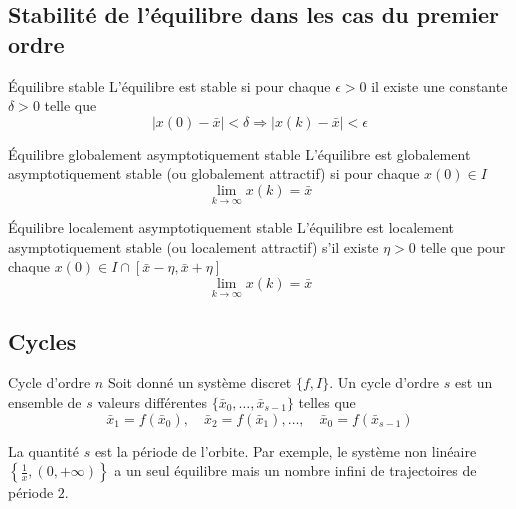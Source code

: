     \subsection{Stabilité de l'équilibre dans les cas du premier ordre}
        \begin{definition}{Équilibre stable}
            L'équilibre est stable si pour chaque $\epsilon > 0$ il existe une constante $\delta > 0$ telle que 
            \begin{equation}
                |x(0) - \bar{x}| < \delta \Rightarrow |x(k) - \bar{x}| < \epsilon
            \end{equation}
        \end{definition}
        \begin{definition}{Équilibre globalement asymptotiquement stable}
            L'équilibre est globalement asymptotiquement stable (ou globalement attractif) si pour chaque $x(0) \in I$
            \begin{equation}
                \lim_{k \to \infty} x(k) = \bar{x}
            \end{equation}
        \end{definition}
        \begin{definition}{Équilibre localement asymptotiquement stable}
            L'équilibre est localement asymptotiquement stable (ou localement attractif) s'il existe $\eta > 0$ telle que pour chaque $x(0) \in I \cap [\bar{x} - \eta, \bar{x} + \eta]$ 
            \begin{equation}
                \lim_{k \to \infty} x(k) = \bar{x}
            \end{equation}
        \end{definition}

        \subsection{Cycles}
            \begin{definition}{Cycle d'ordre $n$}
                Soit donné un système discret $\{f, I\}$. Un cycle d'ordre $s$ est un ensemble de $s$ valeurs différentes $\{\bar{x}_0, \dots, \bar{x}_{s-1}\}$ telles que
                \begin{equation}
                    \bar{x}_1 = f(\bar{x}_0), \quad \bar{x}_2 = f(\bar{x}_1), \dots, \quad \bar{x}_0 = f(\bar{x}_{s-1})
                \end{equation}
            \end{definition}
            La quantité $s$ est la période de l’orbite. Par exemple, le système non linéaire $\left\{ \frac{1}{x}, (0, +\infty) \right\}$ a un seul équilibre mais un nombre infini de trajectoires de période $2$.
        
